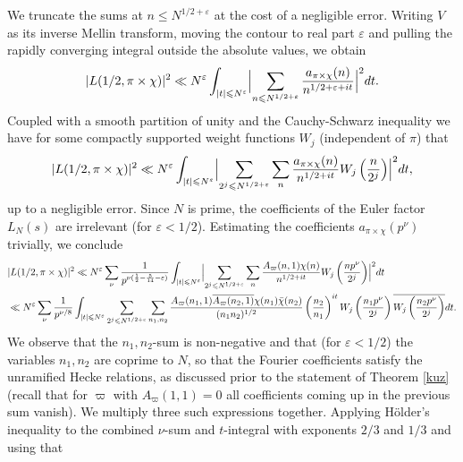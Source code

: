 \documentclass[11pt]{amsart}
\theoremstyle{plain}
\numberwithin{equation}{section}
\theoremstyle{definition}
\renewcommand{\leq}{\leqslant}
\begin{document}
 We truncate the sums at $n \leq N^{1/2+\varepsilon}$ at the cost of a negligible error. Writing $V$ as its inverse Mellin transform, moving the contour to real part $\varepsilon$ and pulling the rapidly converging integral outside the absolute values, we obtain
$$|L(1/2, \pi \times \chi)|^2  \ll  N^{\varepsilon} \int_{|t| \leq N^{\varepsilon} } \Bigl|\sum_{n\leq N^{1/2+\varepsilon}} \frac{a_{\pi \times \chi}(n)}{n^{1/2+\varepsilon + it}} \Bigr|^2 dt.$$
Coupled with  a smooth partition of unity and the Cauchy-Schwarz inequality we have for some compactly supported  weight functions  $W_j$ (independent of $\pi$) that
\begin{displaymath}
\begin{split}
|L(1/2, \pi \times \chi)|^2 \ll  N^{\varepsilon}  \int_{|t| \leq N^{\varepsilon} }  \Bigl|\sum_{2^j \leq N^{1/2+\varepsilon}} \sum_{n} \frac{a_{\pi \times \chi}(n)}{n^{1/2+it}} W_j\left(\frac{n}{2^j}\right)\Bigr|^2 dt,
\end{split}
\end{displaymath}
up to a negligible error. Since $N$ is prime, the coefficients of the Euler factor $L_N(s)$ are irrelevant  (for $\varepsilon< 1/2$). Estimating the coefficients $a_{\pi \times \chi}(p^{\nu})$ trivially,  we conclude
\begin{displaymath}
\begin{split}
& |L(1/2, \pi \times \chi)|^2   \ll  N^{\varepsilon} \sum_{\nu} \frac{1}{p^{\nu(\frac{1}{2} - \frac{5}{14} -\varepsilon)}} \int_{|t| \leq N^{\varepsilon} }  \Bigl|\sum_{2^j \leq N^{1/2+\varepsilon}} \sum_{n} \frac{A_{\varpi}(n, 1) \chi(n)}{n^{1/2+it}} W_j\left(\frac{np^{\nu}}{2^j}\right)\Bigr|^2 dt
\\&
\ll N^{\varepsilon} \sum_{\nu} \frac{1}{p^{\nu/8}} \int_{|t| \leq N^{\varepsilon} } \sum_{2^j \leq N^{1/2+\varepsilon}} \sum_{n_1, n_2}  \frac{A_{\varpi}(n_1, 1) \overline{A_{\varpi}(n_2, 1)} \chi(n_1)\bar{\chi}(n_2)}{(n_1n_2)^{1/2}}  \left(\frac{n_2}{n_1}\right)^{it}W_j\left(\frac{n_1p^{\nu}}{2^j}\right)\overline{W_j\left(\frac{n_2p^{\nu}}{2^j}\right)}  dt.
\end{split}
\end{displaymath}
We observe that the $n_1, n_2$-sum is non-negative and that (for $\varepsilon< 1/2$) the variables $n_1, n_2$ are coprime to $N$, so that the Fourier coefficients satisfy the unramified Hecke relations, as discussed prior to the statement of Theorem \ref{kuz} (recall that for $\varpi$ with $A_{\varpi}(1, 1) = 0$ all coefficients coming up in the previous sum vanish).   We multiply three such expressions together.  Applying H\"older's inequality to the combined $\nu$-sum and $t$-integral with exponents $2/3$ and $1/3$ and using that
\end{document}

